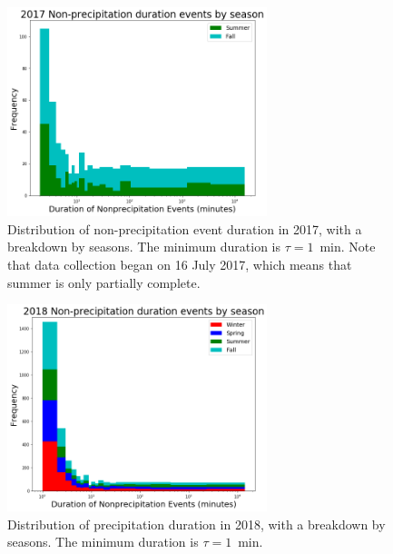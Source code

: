 \documentclass[11pt]{report}
\begin{document}
\clearpage

\begin{figure}[t]
	\centering
	\includegraphics[width=0.675\textwidth]{Figures/nonprecip_2017.png}
	\caption[Histogram of non-precipitation events for 2017 broken down
          by season]{\label{np2017} Distribution of non-precipitation event
          duration in 2017, with a breakdown by seasons. The minimum
          duration is $\tau = 1$~min. Note that data collection began on 16
          July 2017, which means that summer is only partially complete.}
\end{figure}
\begin{figure}[b]
	\centering
	\includegraphics[width=0.675\textwidth]{Figures/nonprecip_2018.png}
	\caption[Histogram of non-precipitation events for 2018 broken down
          by season]{\label{np2018} Distribution of precipitation duration
          in 2018, with a breakdown by seasons. The minimum duration is
          $\tau=1$~min.}
\end{figure}
\end{document}
